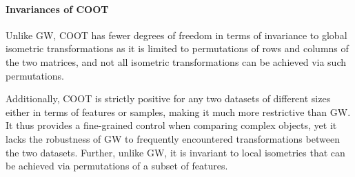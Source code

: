 \paragraph{Invariances of COOT} Unlike GW, COOT has fewer degrees of freedom
in terms of invariance to global isometric transformations as it is limited to
permutations of rows and columns of the two matrices, and not all isometric transformations
can be achieved via such permutations.

Additionally, COOT is strictly positive for any two datasets of different sizes either
in terms of features or samples, making it much more restrictive than GW.
It thus provides a fine-grained control when comparing complex objects,
yet it lacks the robustness of GW to frequently encountered transformations
between the two datasets. Further, unlike GW, it is invariant to local isometries
that can be achieved via permutations of a subset of features.

